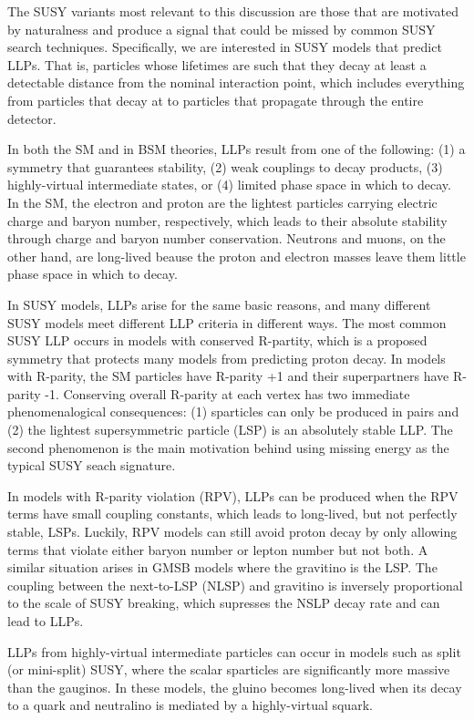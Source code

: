 \documentclass[12pt]{article}
\begin{document}
    The SUSY variants most relevant to this discussion are those that are motivated by naturalness and produce a signal that could be missed by common SUSY search techniques. Specifically, we are interested in SUSY models that predict LLPs. That is, particles whose lifetimes are such that they decay at least a detectable distance from the nominal interaction point, which includes everything from particles that decay at to particles that propagate through the entire detector. 

    In both the SM and in BSM theories, LLPs result from one of the following: (1) a symmetry that guarantees stability, (2) weak couplings to decay products, (3) highly-virtual intermediate states, or (4) limited phase space in which to decay. In the SM, the electron and proton are the lightest particles carrying electric charge and baryon number, respectively, which leads to their absolute stability through charge and baryon number conservation. Neutrons and muons, on the other hand, are long-lived beause the proton and electron masses leave them little phase space in which to decay.

    In SUSY models, LLPs arise for the same basic reasons, and many different SUSY models meet different LLP criteria in different ways. The most common SUSY LLP occurs in models with conserved R-partity, which is a proposed symmetry that protects many models from predicting proton decay. In models with R-parity, the SM particles have R-parity +1 and their superpartners have R-parity -1. Conserving overall R-parity at each vertex has two immediate phenomenalogical consequences: (1) sparticles can only be produced in pairs and (2) the lightest supersymmetric particle (LSP) is an absolutely stable LLP. The second phenomenon is the main motivation behind using missing energy as the typical SUSY seach signature.

    In models with R-parity violation (RPV), LLPs can be produced when the RPV terms have small coupling constants, which leads to long-lived, but not perfectly stable, LSPs. Luckily, RPV models can still avoid proton decay by only allowing terms that violate either baryon number or lepton number but not both. A similar situation arises in GMSB models where the gravitino is the LSP. The coupling between the next-to-LSP (NLSP) and gravitino is inversely proportional to the scale of SUSY breaking, which supresses the NSLP decay rate and can lead to LLPs.

    LLPs from highly-virtual intermediate particles can occur in models such as split (or mini-split) SUSY, where the scalar sparticles are significantly more massive than the gauginos. In these models, the gluino becomes long-lived when its decay to a quark and neutralino is mediated by a highly-virtual squark.
\end{document}
